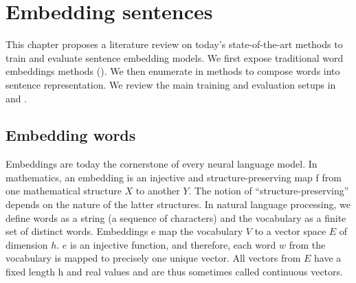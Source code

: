\setchapterpreamble[u]{\margintoc}
\chapter{Embedding sentences}



This chapter proposes a literature review on today's state-of-the-art methods to train and evaluate sentence embedding models. We first expose traditional word embeddings methods (). We then enumerate in  methods to compose words into sentence representation. We review the main training and evaluation setups in  and .

\section{Embedding words}

Embeddings are today the cornerstone of every neural language model. In mathematics, an embedding is an injective and structure-preserving map f from one mathematical structure $X$ to another $Y$. The notion of “structure-preserving” depends on the nature of the latter structures. In natural language processing, we define words as a string (a sequence of characters) and the vocabulary as a finite set of distinct words. Embeddings e map the vocabulary $V$ to a vector space $E$ of dimension $h$. $e$ is an injective function, and therefore, each word $w$ from the vocabulary is mapped to precisely one unique vector. All vectors from $E$ have a fixed length h and real values and are thus sometimes called continuous vectors. 

